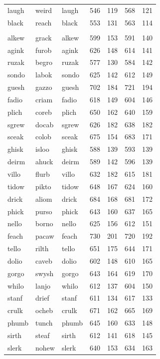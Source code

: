 \documentclass[
]{interact}
\begin{document}
\begin{table}
\begin{tabular*}{\linewidth}{@{\extracolsep{\fill}}lllrrrr}
laugh & weird & laugh & 546 & 119 & 568 & 121 \\ 
black & reach & black & 553 & 131 & 563 & 114 \\ 
\midrule\addlinespace[2.5pt]
\multicolumn{7}{l}{non-word} \\[2.5pt] 
\midrule\addlinespace[2.5pt]
alkew & grack & alkew & 599 & 153 & 591 & 140 \\ 
agink & furob & agink & 626 & 148 & 614 & 141 \\ 
ruzak & begro & ruzak & 577 & 130 & 584 & 142 \\ 
sondo & labok & sondo & 625 & 142 & 612 & 149 \\ 
guesh & gazzo & guesh & 702 & 184 & 721 & 194 \\ 
fadio & criam & fadio & 618 & 149 & 604 & 146 \\ 
plich & coreb & plich & 650 & 162 & 640 & 159 \\ 
sgrew & docab & sgrew & 626 & 182 & 638 & 182 \\ 
sceak & colob & sceak & 675 & 154 & 683 & 171 \\ 
ghisk & isloo & ghisk & 588 & 139 & 593 & 139 \\ 
deirm & ahuck & deirm & 589 & 142 & 596 & 139 \\ 
villo & flurb & villo & 632 & 182 & 615 & 181 \\ 
tidow & pikto & tidow & 648 & 167 & 624 & 160 \\ 
drick & aliom & drick & 684 & 168 & 681 & 172 \\ 
phick & purso & phick & 643 & 160 & 637 & 165 \\ 
nello & borno & nello & 625 & 156 & 612 & 151 \\ 
feach & pacaw & feach & 730 & 201 & 720 & 192 \\ 
tello & rilth & tello & 651 & 175 & 644 & 171 \\ 
dolio & caveb & dolio & 602 & 148 & 610 & 165 \\ 
gorgo & swysh & gorgo & 643 & 164 & 619 & 170 \\ 
whilo & lanjo & whilo & 612 & 137 & 604 & 150 \\ 
stanf & drief & stanf & 611 & 134 & 617 & 133 \\ 
crulk & ocheb & crulk & 671 & 162 & 665 & 169 \\ 
phumb & tunch & phumb & 645 & 160 & 633 & 148 \\ 
sirth & steaf & sirth & 612 & 141 & 618 & 145 \\ 
slerk & nohew & slerk & 640 & 153 & 634 & 163 \\ 

\end{tabular*}
\end{table}
\end{document}
